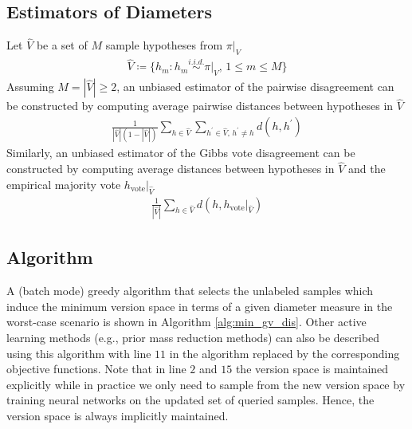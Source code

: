 \documentclass[runningheads, envcountsame, a4paper]{llncs}
\newcommand{\eg}{e.g.}
\begin{document}
\subsection{Estimators of Diameters}
Let $\hat{V}$ be a set of $M$ sample hypotheses from $\pi|_V$
\begin{align}
     \hat{V} \coloneqq \{ h_m: h_m \stackrel{i.i.d.}{\sim} \pi|_V,\, 1 \le m \le M\}
\end{align}
Assuming $M = |\hat{V}| \ge 2$, an unbiased estimator of the pairwise disagreement can be constructed by computing average pairwise distances between hypotheses in $\hat{V}$
\begin{align}
    \frac{1}{|\hat{V}|(1 - |\hat{V}|)} \sum_{h \in \hat{V}}\sum_{h^\prime \in \hat{V},\, h^\prime \neq h} d(h, h^\prime)
\end{align}
Similarly, an unbiased estimator of the Gibbs vote disagreement can be constructed by computing average distances between hypotheses in $\hat{V}$ and the empirical majority vote $h_{\text{vote}}|_{\hat{V}}$
\begin{align}
    \frac{1}{|\hat{V}|} \sum_{h \in \hat{V}} d(h, h_{\text{vote}}|_{\hat{V}})
\end{align}

\subsection{Algorithm}
A (batch mode) greedy algorithm that selects the unlabeled samples which induce the minimum version space in terms of a given diameter measure in the worst-case scenario is shown in Algorithm \ref{alg:min_gv_dis}. Other active learning methods (\eg, prior mass reduction methods) can also be described using this algorithm with line $11$ in the algorithm replaced by the corresponding objective functions. Note that in line $2$ and $15$ the version space is maintained explicitly while in practice we only need to sample from the new version space by training neural networks on the updated set of queried samples. Hence, the version space is always implicitly maintained.
\end{document}
